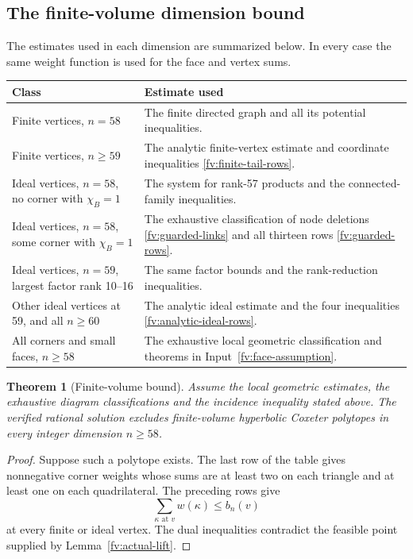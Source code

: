 \documentclass[11pt]{article}
\newtheorem{theorem}{Theorem}[section]
\theoremstyle{definition}
\theoremstyle{remark}
\numberwithin{equation}{section}
\begin{document}
\subsection{The finite-volume dimension bound}
\label{fv:all-dimensions}

The estimates used in each dimension are summarized below. In every
case the same weight function is used for the face and vertex sums.
\begin{center}\small
\begin{tabular}{p{}p{}}
\toprule
Class&Estimate used\\\midrule
Finite vertices, $n=58$&The finite directed graph and all its
 potential inequalities.\\
Finite vertices, $n\ge59$&The analytic finite-vertex estimate and
 coordinate inequalities \eqref{fv:finite-tail-rows}.\\
Ideal vertices, $n=58$, no corner with $\chi_B=1$&The system for
 rank-57 products and the connected-family inequalities.\\
Ideal vertices, $n=58$, some corner with $\chi_B=1$&The exhaustive
 classification of node deletions \eqref{fv:guarded-links} and all thirteen
 rows \eqref{fv:guarded-rows}.\\
Ideal vertices, $n=59$, largest factor rank 10--16&The same factor
 bounds and the rank-reduction inequalities.\\
Other ideal vertices at 59, and all $n\ge60$&The analytic ideal
 estimate and the four inequalities \eqref{fv:analytic-ideal-rows}.\\
All corners and small faces, $n\ge58$&The exhaustive local
 geometric classification and theorems in Input~\ref{fv:face-assumption}.\\
\bottomrule
\end{tabular}
\end{center}

\begin{theorem}[Finite-volume bound]\label{fv:recovery}
Assume the local geometric estimates, the exhaustive diagram
classifications and the incidence inequality stated above. The
verified rational solution excludes finite-volume hyperbolic Coxeter
polytopes in every integer dimension $n\ge58$.
\end{theorem}

\begin{proof}
Suppose such a polytope exists. The last row of the table gives
nonnegative corner weights whose sums are at least two on each
triangle and at least one on each quadrilateral. The preceding rows give
\[
 \sum_{\kappa\text{ at }v}w(\kappa)\le b_n(v)
\]
at every finite or ideal vertex. The dual inequalities contradict
the feasible point supplied by Lemma~\ref{fv:actual-lift}.
\end{proof}
\end{document}
